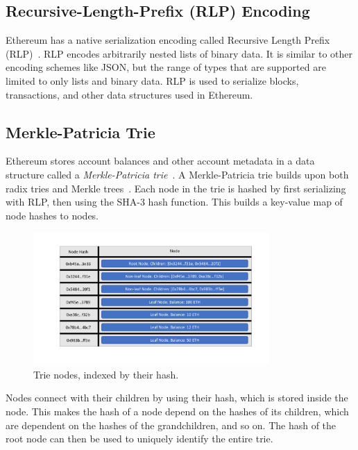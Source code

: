 \documentclass[12pt]{article}
\newcommand{\figurewidth}{0.8\textwidth}
\begin{document}
\subsection{Recursive-Length-Prefix (RLP) Encoding} \label{subsection:rlp}

Ethereum has a native serialization encoding called Recursive Length Prefix (RLP)~\cite{rlp}. RLP encodes arbitrarily nested lists of binary data. It is similar to other encoding schemes like JSON, but the range of types that are supported are limited to only lists and binary data. RLP is used to serialize blocks, transactions, and other data structures used in Ethereum.

\subsection{Merkle-Patricia Trie} \label{subsection:merklepatriciatrie}

Ethereum stores account balances and other account metadata in a data structure called a \emph{Merkle-Patricia trie}~\cite{merkle-patricia-trie}. A Merkle-Patricia trie builds upon both radix tries and Merkle trees~\cite{merkle1987digital}. Each node in the trie is hashed by first serializing with RLP, then using the SHA-3 hash function. This builds a key-value map of node hashes to nodes.

\begin{figure}[H]
  \centering
  \includegraphics[width=\figurewidth]{../figures/background/trie/tree_nodes.pdf}
  \caption{Trie nodes, indexed by their hash.} \label{fig:trienodes}
\end{figure}

Nodes connect with their children by using their hash, which is stored inside the node. This makes the hash of a node depend on the hashes of its children, which are dependent on the hashes of the grandchildren, and so on. The hash of the root node can then be used to uniquely identify the entire trie.
\end{document}
